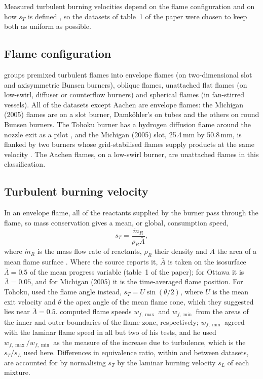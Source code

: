 \documentclass[11pt]{article}
\newcommand{\sL}{s_L}
\begin{document}
Measured turbulent burning velocities depend on the flame configuration and on how $s_T$ is defined \citep{Driscoll2008}, so the datasets of table~1 of the paper were chosen to keep both as uniform as possible.

\subsection{Flame configuration}\label{sec:config}

\citet{Driscoll2008} groups premixed turbulent flames into envelope flames (on two-dimensional slot and axisymmetric Bunsen burners), oblique flames, unattached flat flames (on low-swirl, diffuser or counterflow burners) and spherical flames (in fan-stirred vessels). All of the datasets except Aachen are envelope flames: the Michigan (2005) flames are on a slot burner, Damk\"ohler's on tubes and the others on round Bunsen burners. The Tohoku burner has a hydrogen diffusion flame around the nozzle exit as a pilot \citep{Kobayashi1996}, and the Michigan (2005) slot, 25.4\,mm by 50.8\,mm, is flanked by two burners whose grid-stabilised flames supply products at the same velocity \citep{Filatyev2005}. The Aachen flames, on a low-swirl burner, are unattached flames in this classification.

\subsection{Turbulent burning velocity}\label{sec:sT}

In an envelope flame, all of the reactants supplied by the burner pass through the flame, so mass conservation gives a mean, or global, consumption speed,
\begin{equation}
  s_T = \frac{\dot m_R}{\rho_R \bar A},
  \label{eq:consumption}
\end{equation}
where $\dot m_R$ is the mass flow rate of reactants, $\rho_R$ their density and $\bar A$ the area of a mean flame surface \citep{Filatyev2005,Driscoll2008}. Where the source reports it, $\bar A$ is taken on the isosurface $\overline{\Lambda} = 0.5$ of the mean progress variable (table~1 of the paper); for Ottawa it is $\overline{\Lambda} = 0.05$, and for Michigan (2005) it is the time-averaged flame position. For Tohoku, \citet{Kobayashi1996} used the flame angle instead, $s_T = U \sin(\theta / 2)$, where $U$ is the mean exit velocity and $\theta$ the apex angle of the mean flame cone, which they suggested lies near $\overline{\Lambda} = 0.5$. \citet{Damkohler1940} computed flame speeds $w_{f,\max}$ and $w_{f,\min}$ from the areas of the inner and outer boundaries of the flame zone, respectively; $w_{f,\min}$ agreed with the laminar flame speed in all but two of his tests, and he used $w_{f,\max} / w_{f,\min}$ as the measure of the increase due to turbulence, which is the $s_T / \sL$ used here. Differences in equivalence ratio, within and between datasets, are accounted for by normalising $s_T$ by the laminar burning velocity $\sL$ of each mixture.
\end{document}
